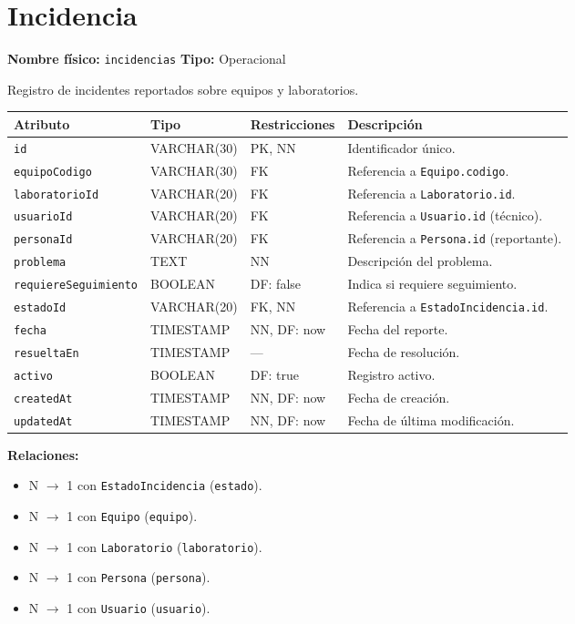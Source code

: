 \documentclass[12pt,a4paper]{article}
\newenvironment{tabladesc}[3]{%
  \section{#1}
  \textbf{Nombre físico:} \texttt{#2} \hfill \textbf{Tipo:} #3\par
  \medskip
}{%
  \bigskip
}
\begin{document}
\begin{tabladesc}{Incidencia}{incidencias}{Operacional}

Registro de incidentes reportados sobre equipos y laboratorios.

\bigskip
\begin{longtable}{L{3.5cm} L{2.5cm} L{2cm} L{7.5cm}}
\toprule
\textbf{Atributo} & \textbf{Tipo} & \textbf{Restricciones} & \textbf{Descripción} \\
\midrule
\endhead
\bottomrule
\endfoot
\texttt{id}                & VARCHAR(30)  & PK, NN & Identificador único. \\
\texttt{equipoCodigo}      & VARCHAR(30)  & FK     & Referencia a \texttt{Equipo.codigo}. \\
\texttt{laboratorioId}     & VARCHAR(20)  & FK     & Referencia a \texttt{Laboratorio.id}. \\
\texttt{usuarioId}         & VARCHAR(20)  & FK     & Referencia a \texttt{Usuario.id} (técnico). \\
\texttt{personaId}         & VARCHAR(20)  & FK     & Referencia a \texttt{Persona.id} (reportante). \\
\texttt{problema}          & TEXT         & NN     & Descripción del problema. \\
\texttt{requiereSeguimiento}& BOOLEAN     & DF: false & Indica si requiere seguimiento. \\
\texttt{estadoId}          & VARCHAR(20)  & FK, NN & Referencia a \texttt{EstadoIncidencia.id}. \\
\texttt{fecha}             & TIMESTAMP    & NN, DF: now & Fecha del reporte. \\
\texttt{resueltaEn}        & TIMESTAMP    & ---    & Fecha de resolución. \\
\texttt{activo}            & BOOLEAN      & DF: true & Registro activo. \\
\texttt{createdAt}         & TIMESTAMP    & NN, DF: now & Fecha de creación. \\
\texttt{updatedAt}         & TIMESTAMP    & NN, DF: now & Fecha de última modificación. \\
\bottomrule
\end{longtable}

\textbf{Relaciones:}
\begin{itemize}[nosep]
  \item N $\rightarrow$ 1 con \texttt{EstadoIncidencia} (\texttt{estado}).
  \item N $\rightarrow$ 1 con \texttt{Equipo} (\texttt{equipo}).
  \item N $\rightarrow$ 1 con \texttt{Laboratorio} (\texttt{laboratorio}).
  \item N $\rightarrow$ 1 con \texttt{Persona} (\texttt{persona}).
  \item N $\rightarrow$ 1 con \texttt{Usuario} (\texttt{usuario}).
\end{itemize}
\end{tabladesc}
\end{document}
